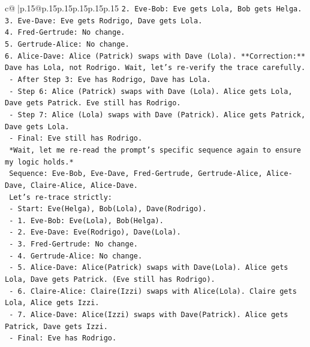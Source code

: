 \documentclass{article}
\begin{document}
{\begin{supertabular}{c@{$\;$}|p{.15\linewidth}@{}p{.15\linewidth}p{.15\linewidth}p{.15\linewidth}p{.15\linewidth}p{.15\linewidth}}
{{{\texttt{2. Eve{-}Bob: Eve gets Lola, Bob gets Helga.} \\
\texttt{3. Eve{-}Dave: Eve gets Rodrigo, Dave gets Lola.} \\
\texttt{4. Fred{-}Gertrude: No change.} \\
\texttt{5. Gertrude{-}Alice: No change.} \\
\texttt{6. Alice{-}Dave: Alice (Patrick) swaps with Dave (Lola). **Correction:** Dave has Lola, not Rodrigo. Wait, let's re{-}verify the trace carefully.} \\
\texttt{   {-} After Step 3: Eve has Rodrigo, Dave has Lola.} \\
\texttt{   {-} Step 6: Alice (Patrick) swaps with Dave (Lola). Alice gets Lola, Dave gets Patrick. Eve still has Rodrigo.} \\
\texttt{   {-} Step 7: Alice (Lola) swaps with Dave (Patrick). Alice gets Patrick, Dave gets Lola.} \\
\texttt{   {-} Final: Eve still has Rodrigo.} \\
\texttt{   *Wait, let me re{-}read the prompt's specific sequence again to ensure my logic holds.*} \\
\texttt{   Sequence: Eve{-}Bob, Eve{-}Dave, Fred{-}Gertrude, Gertrude{-}Alice, Alice{-}Dave, Claire{-}Alice, Alice{-}Dave.} \\
\texttt{   Let's re{-}trace strictly:} \\
\texttt{   {-} Start: Eve(Helga), Bob(Lola), Dave(Rodrigo).} \\
\texttt{   {-} 1. Eve{-}Bob: Eve(Lola), Bob(Helga).} \\
\texttt{   {-} 2. Eve{-}Dave: Eve(Rodrigo), Dave(Lola).} \\
\texttt{   {-} 3. Fred{-}Gertrude: No change.} \\
\texttt{   {-} 4. Gertrude{-}Alice: No change.} \\
\texttt{   {-} 5. Alice{-}Dave: Alice(Patrick) swaps with Dave(Lola). Alice gets Lola, Dave gets Patrick. (Eve still has Rodrigo).} \\
\texttt{   {-} 6. Claire{-}Alice: Claire(Izzi) swaps with Alice(Lola). Claire gets Lola, Alice gets Izzi.} \\
\texttt{   {-} 7. Alice{-}Dave: Alice(Izzi) swaps with Dave(Patrick). Alice gets Patrick, Dave gets Izzi.} \\
\texttt{   {-} Final: Eve has Rodrigo.} \\
\\ 
}}}
\end{supertabular}}
\end{document}
